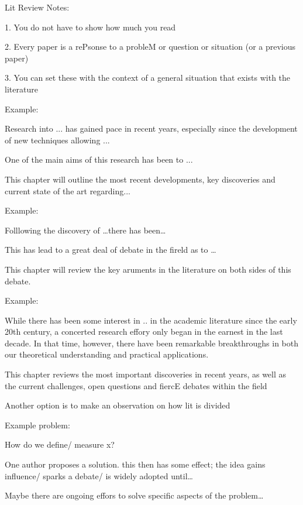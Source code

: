 
Lit Review Notes:

1. You do not have to show how much you read 

2. Every paper is a rePsonse to a probleM or question or situation (or a previous
paper)

3. You can set these with the context of a general situation that exists with 
the literature

Example:

Research into ... has gained pace in recent years, especially since the development
of new techniques allowing ...

One of the main aims of this research has been to ...

This chapter will outline the most recent developments, key discoveries and 
current state of the art regarding...

Example:

Folllowing the discovery of \ldots there has been\ldots

This has lead to a great deal of debate in the fireld as to \ldots

This chapter will review the key aruments in the literature on both sides of this 
debate.

Example:

While there has been some interest in .. in the academic literature since the 
early 20th century, a concerted research effory only began in the earnest in the 
last decade. In that time, however, there have been remarkable breakthroughs in 
both our theoretical understanding and practical applications. 

This chapter reviews the most important discoveries in recent years, as well as 
the current challenges, open questions and fiercE debates within the field 

Another option is to make an observation on how lit is divided 

Example problem:

How do we define/ measure x?

One author proposes a solution. this then has some effect; the idea gains 
influence/ sparks a debate/ is widely adopted until\ldots

Maybe there are ongoing effors to solve specific aspects of the problem\ldots

